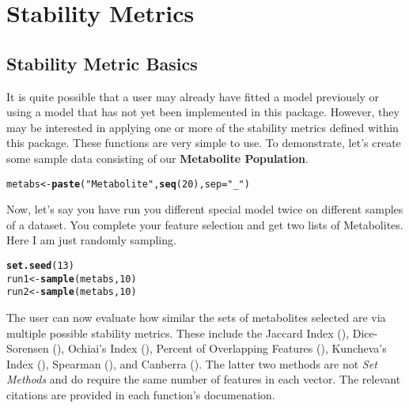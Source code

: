 \documentclass[12pt]{article}\usepackage[]{graphicx}\usepackage[usenames,dvipsnames]{color}
\makeatletter
\newcommand{\hlnum}[1]{\textcolor[rgb]{0.686,0.059,0.569}{#1}}%
\newcommand{\hlstr}[1]{\textcolor[rgb]{0.192,0.494,0.8}{#1}}%
\newcommand{\hlstd}[1]{\textcolor[rgb]{0.345,0.345,0.345}{#1}}%
\newcommand{\hlkwb}[1]{\textcolor[rgb]{0.69,0.353,0.396}{#1}}%
\newcommand{\hlkwc}[1]{\textcolor[rgb]{0.333,0.667,0.333}{#1}}%
\newcommand{\hlkwd}[1]{\textcolor[rgb]{0.737,0.353,0.396}{\textbf{#1}}}%
\newenvironment{kframe}{%
 \def\at@end@of@kframe{}%
 \ifinner\ifhmode%
  \def\at@end@of@kframe{\end{minipage}}%
  \begin{minipage}{\columnwidth}%
 \fi\fi%
 \def\FrameCommand##1{\hskip\@totalleftmargin \hskip-\fboxsep
 \colorbox{shadecolor}{##1}\hskip-\fboxsep
     \hskip-\linewidth \hskip-\@totalleftmargin \hskip\columnwidth}%
 \MakeFramed {\advance\hsize-\width
   \@totalleftmargin\z@ \linewidth\hsize
   \@setminipage}}%
 {\par\unskip\endMakeFramed%
 \at@end@of@kframe}
\newenvironment{knitrout}{}{} %
\makeatother
\begin{document}
\newpage
\maketitle
\section{Stability Metrics}
\subsection{Stability Metric Basics}

It is quite possible that a user may already have fitted a model previously
or using a model that has not yet been implemented in this package.  However,
they may be interested in applying one or more of the stability metrics
defined within this package.  These functions are very simple to use.  To 
demonstrate, let's create some sample data consisting of our \textbf{Metabolite
Population}.

\begin{knitrout}
\color{fgcolor}\begin{kframe}
\begin{alltt}
\hlstd{metabs} \hlkwb{<-} \hlkwd{paste}\hlstd{(}\hlstr{"Metabolite"}\hlstd{,} \hlkwd{seq}\hlstd{(}\hlnum{20}\hlstd{),} \hlkwc{sep}\hlstd{=}\hlstr{"_"}\hlstd{)}
\end{alltt}
\end{kframe}
\end{knitrout}

Now, let's say you have run you different special model twice on different 
samples of a dataset.  You complete your feature selection and get two lists
of Metabolites.  Here I am just randomly sampling.

\begin{knitrout}
\color{fgcolor}\begin{kframe}
\begin{alltt}
\hlkwd{set.seed}\hlstd{(}\hlnum{13}\hlstd{)}
\hlstd{run1} \hlkwb{<-} \hlkwd{sample}\hlstd{(metabs,} \hlnum{10}\hlstd{)}
\hlstd{run2} \hlkwb{<-} \hlkwd{sample}\hlstd{(metabs,} \hlnum{10}\hlstd{)}
\end{alltt}
\end{kframe}
\end{knitrout}

The user can now evaluate how similar the sets of metabolites selected are via
multiple possible stability metrics.  These include the Jaccard Index 
(), Dice-Sorensen (), Ochiai's Index 
(), Percent of Overlapping Features (), 
Kuncheva's Index (), Spearman (), and
Canberra ().  The latter two methods are not 
\emph{Set Methods} and do require the same number of features in each vector.
The relevant citations are provided in each function's documenation.
\end{document}

